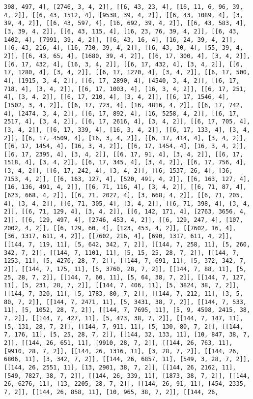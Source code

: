 \documentclass[12pt,fleqn]{article}\usepackage{../../common}
\begin{document}
\begin{verbatim}
398, 497, 4], [2746, 3, 4, 2]], [[6, 43, 23, 4], [16, 11, 6, 96, 39, 4, 2]], [[6, 43, 1512, 4], [9538, 39, 4, 2]], [[6, 43, 1089, 4], [3, 39, 4, 2]], [[6, 43, 597, 4], [16, 692, 39, 4, 2]], [[6, 43, 583, 4], [3, 39, 4, 2]], [[6, 43, 115, 4], [16, 23, 76, 39, 4, 2]], [[6, 43, 1402, 4], [7991, 39, 4, 2]], [[6, 43, 16, 4], [16, 24, 39, 4, 2]], [[6, 43, 216, 4], [16, 730, 39, 4, 2]], [[6, 43, 30, 4], [55, 39, 4, 2]], [[6, 43, 65, 4], [1680, 39, 4, 2]], [[6, 17, 300, 4], [3, 4, 2]], [[6, 17, 432, 4], [16, 3, 4, 2]], [[6, 17, 432, 4], [3, 4, 2]], [[6, 17, 1280, 4], [3, 4, 2]], [[6, 17, 1270, 4], [3, 4, 2]], [[6, 17, 500, 4], [1915, 3, 4, 2]], [[6, 17, 2890, 4], [4540, 3, 4, 2]], [[6, 17, 718, 4], [3, 4, 2]], [[6, 17, 1003, 4], [16, 3, 4, 2]], [[6, 17, 251, 4], [3, 4, 2]], [[6, 17, 210, 4], [3, 4, 2]], [[6, 17, 1546, 4], [1502, 3, 4, 2]], [[6, 17, 723, 4], [16, 4816, 4, 2]], [[6, 17, 742, 4], [2474, 3, 4, 2]], [[6, 17, 892, 4], [16, 5258, 4, 2]], [[6, 17, 2517, 4], [3, 4, 2]], [[6, 17, 2616, 4], [3, 4, 2]], [[6, 17, 705, 4], [3, 4, 2]], [[6, 17, 339, 4], [16, 3, 4, 2]], [[6, 17, 133, 4], [3, 4, 2]], [[6, 17, 4509, 4], [16, 3, 4, 2]], [[6, 17, 414, 4], [3, 4, 2]], [[6, 17, 1454, 4], [16, 3, 4, 2]], [[6, 17, 1454, 4], [16, 3, 4, 2]], [[6, 17, 2395, 4], [3, 4, 2]], [[6, 17, 91, 4], [3, 4, 2]], [[6, 17, 1518, 4], [3, 4, 2]], [[6, 17, 345, 4], [3, 4, 2]], [[6, 17, 756, 4], [3, 4, 2]], [[6, 17, 242, 4], [3, 4, 2]], [[6, 1537, 26, 4], [36, 7153, 4, 2]], [[6, 163, 127, 4], [520, 491, 4, 2]], [[6, 163, 127, 4], [16, 136, 491, 4, 2]], [[6, 71, 116, 4], [3, 4, 2]], [[6, 71, 87, 4], [623, 668, 4, 2]], [[6, 71, 2027, 4], [3, 668, 4, 2]], [[6, 71, 205, 4], [3, 4, 2]], [[6, 71, 305, 4], [3, 4, 2]], [[6, 71, 398, 4], [3, 4, 2]], [[6, 71, 129, 4], [3, 4, 2]], [[6, 142, 171, 4], [2763, 3656, 4, 2]], [[6, 129, 497, 4], [2746, 453, 4, 2]], [[6, 129, 247, 4], [107, 2002, 4, 2]], [[6, 129, 60, 4], [123, 453, 4, 2]], [[7602, 16, 4], [36, 1317, 611, 4, 2]], [[7602, 216, 4], [690, 1317, 611, 4, 2]], [[144, 7, 119, 11], [5, 642, 342, 7, 2]], [[144, 7, 258, 11], [5, 260, 342, 7, 2]], [[144, 7, 1101, 11], [5, 15, 25, 28, 7, 2]], [[144, 7, 1253, 11], [5, 4270, 28, 7, 2]], [[144, 7, 691, 11], [5, 372, 342, 7, 2]], [[144, 7, 175, 11], [5, 3760, 28, 7, 2]], [[144, 7, 88, 11], [5, 25, 28, 7, 2]], [[144, 7, 60, 11], [5, 64, 38, 7, 2]], [[144, 7, 127, 11], [5, 231, 28, 7, 2]], [[144, 7, 406, 11], [5, 3824, 38, 7, 2]], [[144, 7, 320, 11], [5, 1783, 80, 7, 2]], [[144, 7, 212, 11], [3, 5, 80, 7, 2]], [[144, 7, 2471, 11], [5, 3431, 38, 7, 2]], [[144, 7, 533, 11], [5, 1052, 28, 7, 2]], [[144, 7, 7695, 11], [5, 9, 4598, 2415, 38, 7, 2]], [[144, 7, 427, 11], [5, 473, 38, 7, 2]], [[144, 7, 147, 11], [5, 131, 28, 7, 2]], [[144, 7, 911, 11], [5, 130, 80, 7, 2]], [[144, 7, 176, 11], [5, 25, 28, 7, 2]], [[144, 32, 133, 11], [10, 847, 38, 7, 2]], [[144, 26, 651, 11], [9910, 28, 7, 2]], [[144, 26, 763, 11], [9910, 28, 7, 2]], [[144, 26, 1316, 11], [3, 28, 7, 2]], [[144, 26, 6806, 11], [3, 342, 7, 2]], [[144, 26, 6857, 11], [549, 3, 28, 7, 2]], [[144, 26, 2551, 11], [13, 2901, 38, 7, 2]], [[144, 26, 2162, 11], [549, 7827, 38, 7, 2]], [[144, 26, 339, 11], [1873, 38, 7, 2]], [[144, 26, 6276, 11], [13, 2205, 28, 7, 2]], [[144, 26, 91, 11], [454, 2335, 7, 2]], [[144, 26, 858, 11], [10, 965, 38, 7, 2]], [[144, 26, 
\end{verbatim}
\end{document}
